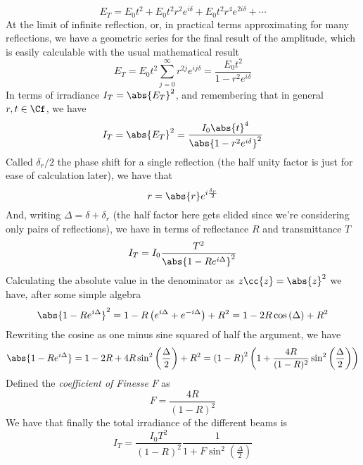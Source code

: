 \documentclass[../electromagnetism.tex]{subfiles}
\begin{document}
\begin{equation*}
	E_T=E_0t^2+E_0t^2r^2e^{i\delta}+E_0t^2r^4e^{2i\delta}+\cdots
\end{equation*}
At the limit of infinite reflection, or, in practical terms approximating for many reflections, we have a geometric series for the final result of the amplitude, which is easily calculable with the usual mathematical result
\begin{equation}
	E_T=E_0t^2\sum_{j=0}^{\infty}r^{2j}e^{ij\delta}=\frac{E_0t^2}{1-r^2e^{i\delta}}
	\label{eq:totalamplitudembi}
\end{equation}
In terms of irradiance $I_T=\abs{E_T}^2$, and remembering that in general $r,t\in\Cf$, we have
\begin{equation}
	I_T=\abs{E_T}^2=\frac{I_0\abs{t}^4}{\abs{1-r^2e^{i\delta}}^2}
	\label{eq:intmbibefore}
\end{equation}
Called $\delta_r/2$ the phase shift for a single reflection (the half unity factor is just for ease of calculation later), we have that 
\begin{equation*}
	r=\abs{r}e^{i\frac{\delta_r}{2}}
\end{equation*}
And, writing $\Delta=\delta+\delta_r$ (the half factor here gets elided since we're considering only pairs of reflections), we have in terms of reflectance $R$ and transmittance $T$
\begin{equation*}
	I_T=I_0\frac{T^2}{\abs{1-Re^{i\Delta}}^2}
\end{equation*}
Calculating the absolute value in the denominator as $z\cc{z}=\abs{z}^2$ we have, after some simple algebra
\begin{equation*}
	\abs{1-Re^{i\Delta}}^2=1-R\left( e^{i\Delta}+e^{-i\Delta} \right)+R^2=1-2R\cos\left( \Delta \right)+R^2
\end{equation*}
Rewriting the cosine as one minus sine squared of half the argument, we have
\begin{equation*}
	\abs{1-Re^{i\Delta}}=1-2R+4R\sin^2\left( \frac{\Delta}{2} \right)+R^2=\left( 1-R \right)^2\left( 1+\frac{4R}{(1-R)^2}\sin^2\left( \frac{\Delta}{2} \right) \right)
\end{equation*}
Defined the \emph{coefficient of Finesse} $F$ as 
\begin{equation}
	F=\frac{4R}{(1-R)^2}
	\label{eq:finessecoefficient}
\end{equation}
We have that finally the total irradiance of the different beams is 
\begin{equation}
	I_T=\frac{I_0T^2}{(1-R)^2}\frac{1}{1+F\sin^2\left( \frac{\Delta}{2} \right)}
	\label{eq:irradianceairymbi}
\end{equation}
\end{document}
